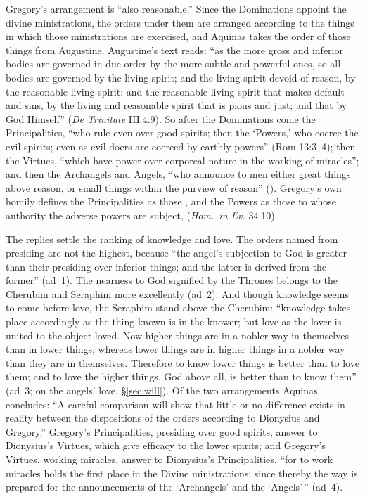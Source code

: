 Gregory's arrangement is ``also reasonable.'' Since the Dominations appoint
the divine ministrations, the orders under them are arranged according to
the things in which those ministrations are exercised, and Aquinas takes the
order of those things from Augustine. Augustine's text reads: ``as the more
gross and inferior bodies are governed in due order by the more subtle and
powerful ones, so all bodies are governed by the living spirit; and the
living spirit devoid of reason, by the reasonable living spirit; and the
reasonable living spirit that makes default and sins, by the living and
reasonable spirit that is pious and just; and that by God Himself''
(\emph{De Trinitate} III.4.9). So after the Dominations come the
Principalities, ``who rule even over good spirits; then the `Powers,' who
coerce the evil spirits; even as evil-doers are coerced by earthly powers''
(Rom 13:3--4); then the Virtues, ``which have power over corporeal nature in
the working of miracles''; and then the Archangels and Angels, ``who announce
to men either great things above reason, or small things within the purview
of reason'' (). Gregory's own homily defines the
Principalities as those , and the Powers as those to whose
authority the adverse powers are subject, 
(\emph{Hom.\ in Ev.} 34.10).

The replies settle the ranking of knowledge and love. The orders named from
presiding are not the highest, because ``the angel's subjection to God is
greater than their presiding over inferior things; and the latter is derived
from the former'' (ad~1). The nearness to God signified by the Thrones
belongs to the Cherubim and Seraphim more excellently (ad~2). And though
knowledge seems to come before love, the Seraphim stand above the Cherubim:
``knowledge takes place accordingly as the thing known is in the knower; but
love as the lover is united to the object loved. Now higher things are in a
nobler way in themselves than in lower things; whereas lower things are in
higher things in a nobler way than they are in themselves. Therefore to know
lower things is better than to love them; and to love the higher things, God
above all, is better than to know them'' (ad~3; on the angels' love,
\S\ref{sec:will}). Of the two arrangements Aquinas concludes: ``A careful
comparison will show that little or no difference exists in reality between
the dispositions of the orders according to Dionysius and Gregory.''
Gregory's Principalities, presiding over good spirits, answer to Dionysius's
Virtues, which give efficacy to the lower spirits; and Gregory's Virtues,
working miracles, answer to Dionysius's Principalities, ``for to work
miracles holds the first place in the Divine ministrations; since thereby the
way is prepared for the announcements of the `Archangels' and the `Angels'\,''
(ad~4).


